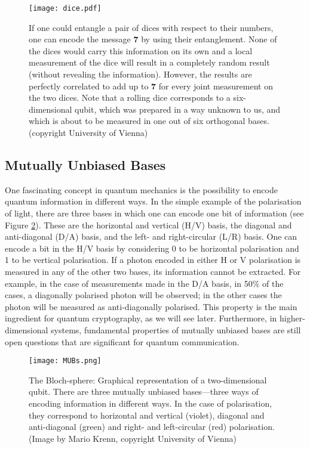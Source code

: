 \documentclass{article}
\begin{document}
\begin{figure}[h!]
\centering
\texttt{[image: dice.pdf]}
\caption{If one could entangle a pair of dices with respect to their numbers, one can encode the message \textbf{7} by using their entanglement. None of the dices would carry this information on its own and a local measurement of the dice will result in a completely random result (without revealing the information). However, the results are perfectly correlated to add up to \textbf{7} for every joint measurement on the two dices. Note that a rolling dice corresponds to a six-dimensional qubit, which was prepared in a way unknown to us, and which is about to be measured in one out of six orthogonal bases.  (copyright University of Vienna)}
\label{fig:entanglement}
\end{figure}

\subsection{Mutually Unbiased Bases}
One fascinating concept in quantum mechanics is the possibility to encode quantum information in different ways. In the simple example of the polarisation of light, there are three bases in which one can encode one bit of information (see Figure \ref{fig:MUBs}). These are the horizontal and vertical (H/V) basis, the diagonal and anti-diagonal (D/A) basis, and the left- and right-circular (L/R) basis. One can encode a bit in the H/V basis by considering 0 to be horizontal polarisation and 1 to be vertical polarisation. If a photon encoded in either H or V polarisation is measured in any of the other two bases, its information cannot be extracted. For example, in the case of measurements made in the D/A basis, in 50\% of the cases, a diagonally polarised photon will be observed; in the other cases the photon will be measured as anti-diagonally polarised. This property is the main ingredient for quantum cryptography, as we will see later. Furthermore, in higher-dimensional systems, fundamental properties of mutually unbiased bases are still open questions that are significant for quantum communication.

\begin{figure}[h!]
\centering
\texttt{[image: MUBs.png]}
\caption{The Bloch-sphere: Graphical representation of a two-dimensional qubit. There are three mutually unbiased bases---three ways of encoding information in different ways. In the case of polarisation, they correspond to horizontal and vertical (violet), diagonal and anti-diagonal (green) and right- and left-circular (red) polarisation. (Image by Mario Krenn, copyright University of Vienna)}
\label{fig:MUBs}
\end{figure}
\end{document}
